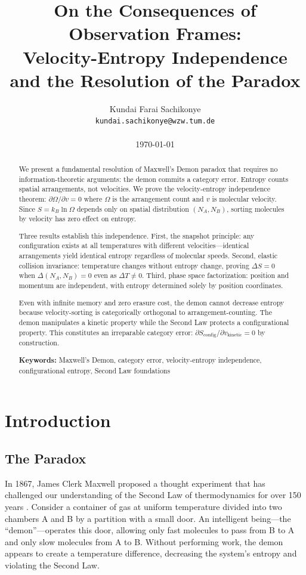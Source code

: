 \documentclass[10pt,twocolumn,letterpaper]{article}
\title{\LARGE \textbf{On the Consequences of Observation Frames:\\
Velocity-Entropy Independence and the Resolution of the Paradox}}
\author{
    Kundai Farai Sachikonye\\
    \texttt{kundai.sachikonye@wzw.tum.de}\\
    \\
    \today
}
\date{}
\theoremstyle{definition}
\theoremstyle{remark}
\begin{document}
\maketitle

\begin{abstract}
We present a fundamental resolution of Maxwell's Demon paradox that requires no information-theoretic arguments: the demon commits a category error. Entropy counts spatial arrangements, not velocities. We prove the velocity-entropy independence theorem: $\partial\Omega/\partial v = 0$ where $\Omega$ is the arrangement count and $v$ is molecular velocity. Since $S = k_B \ln \Omega$ depends only on spatial distribution $(N_A, N_B)$, sorting molecules by velocity has zero effect on entropy.

Three results establish this independence. First, the snapshot principle: any configuration exists at all temperatures with different velocities—identical arrangements yield identical entropy regardless of molecular speeds. Second, elastic collision invariance: temperature changes without entropy change, proving $\Delta S = 0$ when $\Delta(N_A, N_B) = 0$ even as $\Delta T \neq 0$. Third, phase space factorization: position and momentum are independent, with entropy determined solely by position coordinates.

Even with infinite memory and zero erasure cost, the demon cannot decrease entropy because velocity-sorting is categorically orthogonal to arrangement-counting. The demon manipulates a kinetic property while the Second Law protects a configurational property. This constitutes an irreparable category error: $\partial S_{\text{config}}/\partial v_{\text{kinetic}} = 0$ by construction.

\textbf{Keywords:} Maxwell's Demon, category error, velocity-entropy independence, configurational entropy, Second Law foundations
\end{abstract}

\section{Introduction}

\subsection{The Paradox}

In 1867, James Clerk Maxwell proposed a thought experiment that has challenged our understanding of the Second Law of thermodynamics for over 150 years \cite{maxwell1867}. Consider a container of gas at uniform temperature divided into two chambers A and B by a partition with a small door. An intelligent being—the ``demon''—operates this door, allowing only fast molecules to pass from B to A and only slow molecules from A to B. Without performing work, the demon appears to create a temperature difference, decreasing the system's entropy and violating the Second Law.
\end{document}
